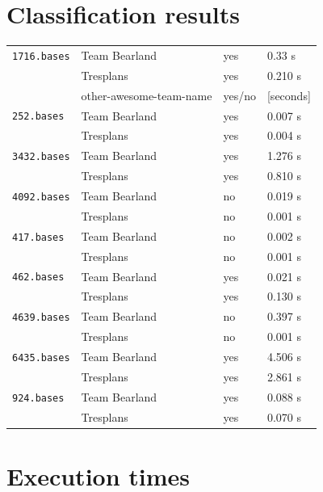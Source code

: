 \documentclass[11pt]{amsart}
\begin{document}
\section{Classification results}

\begin{center}
  \begin{tabular}[c]{llll}
    \hline
    \texttt{1716.bases}
    & Team Bearland
    & yes
    & 0.33 s
    \\
    & Tresplans
    & yes
    & 0.210 s
    \\
    & other-awesome-team-name
    & yes/no
    & [seconds]
    \\\hline
      \texttt{252.bases}
    & Team Bearland
    & yes
    & 0.007 s
    \\
    & Tresplans
    & yes
    & 0.004 s
    \\\hline
      \texttt{3432.bases}
    & Team Bearland
    & yes
    & 1.276 s
    \\
    & Tresplans
    & yes
    & 0.810 s
    \\\hline
      \texttt{4092.bases}
    & Team Bearland
    & no
    & 0.019 s
    \\
    & Tresplans
    & no
    & 0.001 s
    \\\hline
      \texttt{417.bases}
    & Team Bearland
    & no
    & 0.002 s
    \\
    & Tresplans
    & no
    & 0.001 s
    \\\hline
      \texttt{462.bases}
    & Team Bearland
    & yes
    & 0.021 s
    \\
    & Tresplans
    & yes
    & 0.130 s
    \\\hline
      \texttt{4639.bases}
    & Team Bearland
    & no
    & 0.397 s
    \\
    & Tresplans
    & no
    & 0.001 s
    \\\hline
    \texttt{6435.bases}
    & Team Bearland
    & yes
    & 4.506 s
    \\
    & Tresplans
    & yes
    & 2.861 s
    \\\hline
    \texttt{924.bases}
    & Team Bearland
    & yes
    & 0.088 s
    \\
    & Tresplans
    & yes
    & 0.070 s
    \\\hline
  \end{tabular}
\end{center}

\section{Execution times}
\end{document}
